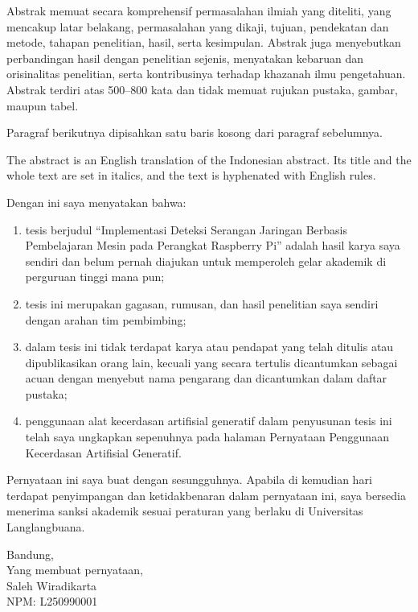 \documentclass{mti-unla}       %
\begin{document}
\buathalamanjudul

\begin{abstrak}
Abstrak memuat secara komprehensif permasalahan ilmiah yang diteliti, yang mencakup latar belakang, permasalahan yang dikaji, tujuan, pendekatan dan metode, tahapan penelitian, hasil, serta kesimpulan. Abstrak juga menyebutkan perbandingan hasil dengan penelitian sejenis, menyatakan kebaruan dan orisinalitas penelitian, serta kontribusinya terhadap khazanah ilmu pengetahuan. Abstrak terdiri atas 500--800 kata dan tidak memuat rujukan pustaka, gambar, maupun tabel.

Paragraf berikutnya dipisahkan satu baris kosong dari paragraf sebelumnya.
\end{abstrak}

\begin{abstract*}
The abstract is an English translation of the Indonesian abstract. Its title and the whole text are set in italics, and the text is hyphenated with English rules.
\end{abstract*}

\buatpengesahan

\begin{singlespace}\setlength{\parskip}{12pt}
Dengan ini saya menyatakan bahwa:
\begin{enumerate}[itemsep=6pt]
\item tesis berjudul \enquote{Implementasi Deteksi Serangan Jaringan Berbasis Pembelajaran Mesin pada Perangkat Raspberry Pi} adalah hasil karya saya sendiri dan belum pernah diajukan untuk memperoleh gelar akademik di perguruan tinggi mana pun;
\item tesis ini merupakan gagasan, rumusan, dan hasil penelitian saya sendiri dengan arahan tim pembimbing;
\item dalam tesis ini tidak terdapat karya atau pendapat yang telah ditulis atau dipublikasikan orang lain, kecuali yang secara tertulis dicantumkan sebagai acuan dengan menyebut nama pengarang dan dicantumkan dalam daftar pustaka;
\item penggunaan alat kecerdasan artifisial generatif dalam penyusunan tesis ini telah saya ungkapkan sepenuhnya pada halaman Pernyataan Penggunaan Kecerdasan Artifisial Generatif.
\end{enumerate}
Pernyataan ini saya buat dengan sesungguhnya. Apabila di kemudian hari terdapat penyimpangan dan ketidakbenaran dalam pernyataan ini, saya bersedia menerima sanksi akademik sesuai peraturan yang berlaku di Universitas Langlangbuana.
\end{singlespace}
\begin{tandatangan}
Bandung, \makebox[4cm]{\dotfill}\\
Yang membuat pernyataan,\\[2.5cm]
Saleh Wiradikarta\\
NPM: L250990001
\end{tandatangan}
\end{document}
